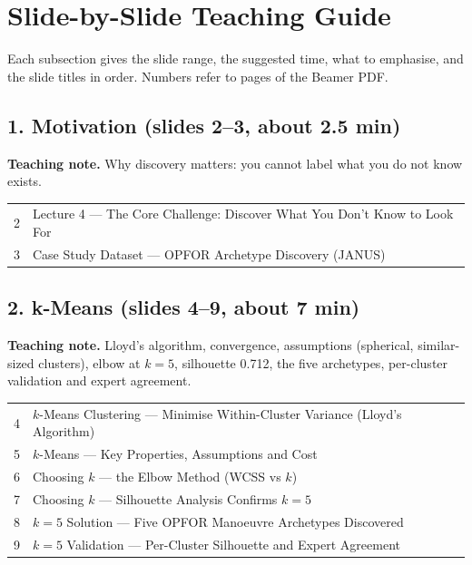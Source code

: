 \documentclass[11pt]{article}
\begin{document}
\section{Slide-by-Slide Teaching Guide}

Each subsection gives the slide range, the suggested time, what to emphasise, and the slide titles in order. Numbers refer to pages of the Beamer PDF.

\subsection{1. Motivation \normalfont\small\color{GreyN}(slides 2--3, about 2.5 min)}

\textbf{Teaching note.} Why discovery matters: you cannot label what you do not know exists.

\begin{center}\small\renewcommand{\arraystretch}{1.1}\begin{tabularx}{\textwidth}{@{}r X@{}}2 & Lecture 4 --- The Core Challenge: Discover What You Don't Know to Look For\\
3 & Case Study Dataset --- OPFOR Archetype Discovery (JANUS)\\\end{tabularx}\end{center}

\subsection{2. k-Means \normalfont\small\color{GreyN}(slides 4--9, about 7 min)}

\textbf{Teaching note.} Lloyd's algorithm, convergence, assumptions (spherical, similar-sized clusters), elbow at $k=5$, silhouette 0.712, the five archetypes, per-cluster validation and expert agreement.

\begin{center}\small\renewcommand{\arraystretch}{1.1}\begin{tabularx}{\textwidth}{@{}r X@{}}4 & $k$-Means Clustering --- Minimise Within-Cluster Variance (Lloyd's Algorithm)\\
5 & $k$-Means --- Key Properties, Assumptions and Cost\\
6 & Choosing $k$ --- the Elbow Method (WCSS vs $k$)\\
7 & Choosing $k$ --- Silhouette Analysis Confirms $k=5$\\
8 & $k=5$ Solution --- Five OPFOR Manoeuvre Archetypes Discovered\\
9 & $k=5$ Validation --- Per-Cluster Silhouette and Expert Agreement\\\end{tabularx}\end{center}
\end{document}
